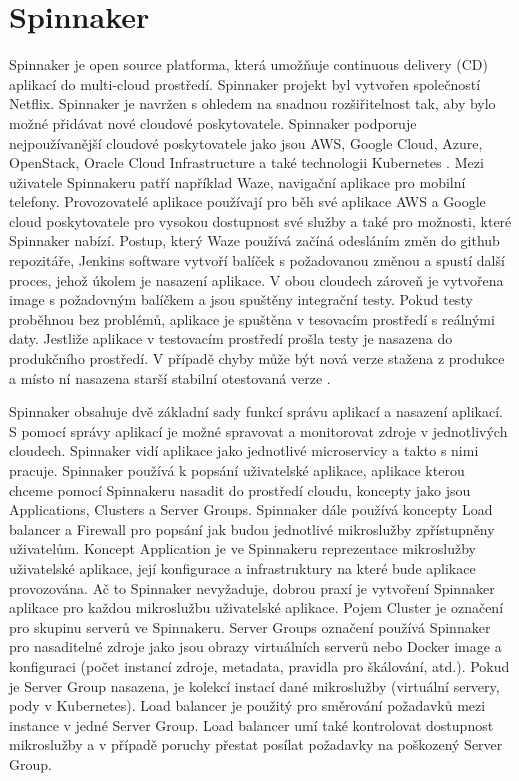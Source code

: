 \section{Spinnaker}
Spinnaker je open source platforma, která umožňuje continuous delivery (CD) aplikací do multi-cloud prostředí. Spinnaker projekt byl vytvořen společností Netflix. Spinnaker je navržen s ohledem na snadnou rozšiřitelnost tak, aby bylo možné přidávat nové cloudové poskytovatele. Spinnaker podporuje nejpoužívanější cloudové poskytovatele jako jsou AWS, Google Cloud, Azure, OpenStack, Oracle Cloud Infrastructure a také technologii Kubernetes \cite{netflix-spinnaker}. Mezi uživatele Spinnakeru patří například Waze, navigační aplikace pro mobilní telefony. Provozovatelé aplikace používají pro běh své aplikace AWS a Google cloud poskytovatele pro vysokou dostupnost své služby a také pro možnosti, které Spinnaker nabízí. Postup, který Waze používá začíná odesláním změn do github repozitáře, Jenkins software vytvoří balíček s požadovanou změnou a spustí další proces, jehož úkolem je nasazení aplikace. V obou cloudech zároveň je vytvořena image s požadovným balíčkem a jsou spuštěny integrační testy. Pokud testy proběhnou bez problémů, aplikace je spuštěna v tesovacím prostředí s reálnými daty. Jestliže aplikace v testovacím prostředí prošla testy je nasazena do produkčního prostředí. V případě chyby může být nová verze stažena z produkce a místo ní nasazena starší stabilní otestovaná verze \cite{waze}.\par
Spinnaker obsahuje dvě základní sady funkcí správu aplikací a nasazení aplikací. S pomocí správy aplikací je možné spravovat a monitorovat zdroje v jednotlivých \linebreak cloudech. Spinnaker vidí aplikace jako jednotlivé microservicy a takto s nimi pracuje. Spinnaker používá k popsání uživatelské aplikace, aplikace kterou chceme pomocí Spinnakeru nasadit do prostředí cloudu, koncepty jako jsou Applications, Clusters a Server Groups. Spinnaker dále používá koncepty Load balancer a Firewall pro popsání jak budou jednotlivé mikroslužby zpřístupněny uživatelům. Koncept Application je ve Spinnakeru reprezentace mikroslužby uživatelské aplikace, její konfigurace a infrastruktury na které bude aplikace provozována. Ač to Spinnaker nevyžaduje, dobrou praxí je vytvoření Spinnaker aplikace pro každou mikroslužbu uživatelské aplikace. Pojem Cluster je označení pro skupinu serverů ve Spinnakeru. Server Groups označení používá Spinnaker pro nasaditelné zdroje jako jsou obrazy virtuálních serverů nebo Docker image a konfiguraci (počet instancí zdroje, metadata, pravidla pro škálování, atd.). Pokud je Server Group nasazena, je kolekcí instací dané mikroslužby (virtuální servery, pody v Kubernetes). Load balancer je použitý pro směrování požadavků mezi instance v jedné Server Group. Load balancer umí také kontrolovat dostupnost \linebreak mikroslužby a v případě poruchy přestat posílat požadavky na poškozený Server Group.\par
